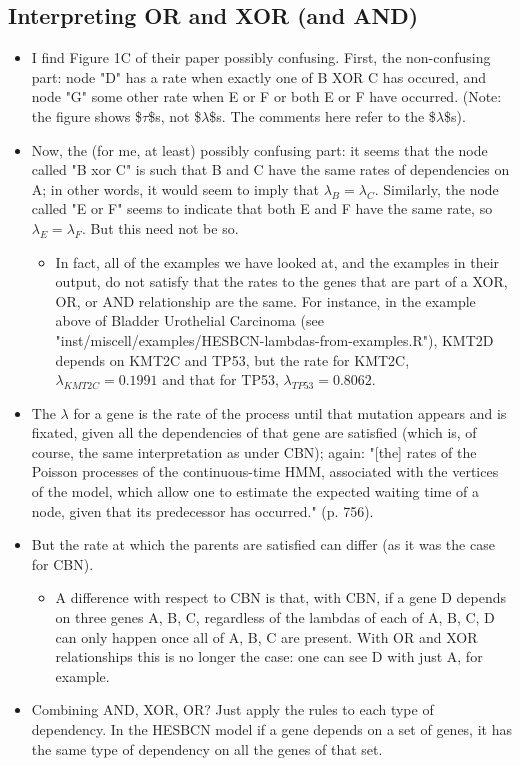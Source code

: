 \documentclass[11pt]{article}
\begin{document}
\subsection{Interpreting OR and XOR (and AND)}
\label{sec:org94629c0}
\begin{itemize}
\item I find Figure 1C  of their paper possibly confusing. First, the non-confusing part:  node "D" has a rate when exactly one of B XOR C has occured, and node "G" some other rate when E or F or both E or F have occurred. (Note: the figure shows \$\(\tau\)\$s, not \$\(\lambda\)\$s. The comments here refer to the \$\(\lambda\)\$s).
\item Now, the (for me, at least) possibly confusing part: it seems that the node called "B xor C" is such that B and C have the same rates of dependencies on A; in other words, it would seem to imply that \(\lambda_B = \lambda_C\). Similarly, the node called "E or F" seems to indicate that both E and F have the same rate, so \(\lambda_E = \lambda_F\). But this need not be so.
\begin{itemize}
\item In fact, all of the examples we have looked at, and the examples in their output, do not satisfy that the rates to the genes that are part of a XOR, OR, or AND relationship are the same. For instance, in the example above of Bladder Urothelial Carcinoma (see "inst/miscell/examples/HESBCN-lambdas-from-examples.R"), KMT2D depends on KMT2C and TP53, but the rate for KMT2C, \(\lambda_{KMT2C} = 0.1991\) and that for TP53, \(\lambda_{TP53} = 0.8062\).
\end{itemize}
\item The \(\lambda\) for a gene is the rate of the process until that mutation appears and is fixated, given all the dependencies of that gene are satisfied (which is, of course, the same interpretation as under CBN); again:  "[the] rates of the Poisson processes of the continuous-time HMM, associated with the vertices of the model, which allow one to estimate the expected waiting time of a node, given that its predecessor has occurred." (p. 756).
\item But the rate at which the parents are satisfied can differ (as it was the case for CBN).
\begin{itemize}
\item A difference with respect to CBN is that, with CBN, if a gene D depends on three genes A, B, C, regardless of the lambdas of each of A, B, C, D can only happen once all of A, B, C are present. With OR and XOR relationships this is no longer the case: one can see D with just A, for example.
\end{itemize}
\item Combining AND, XOR, OR? Just apply the rules to each type of dependency. In the HESBCN model if a gene depends on a set of genes, it has the same type of dependency on all the genes of that set.
\end{itemize}
\end{document}
